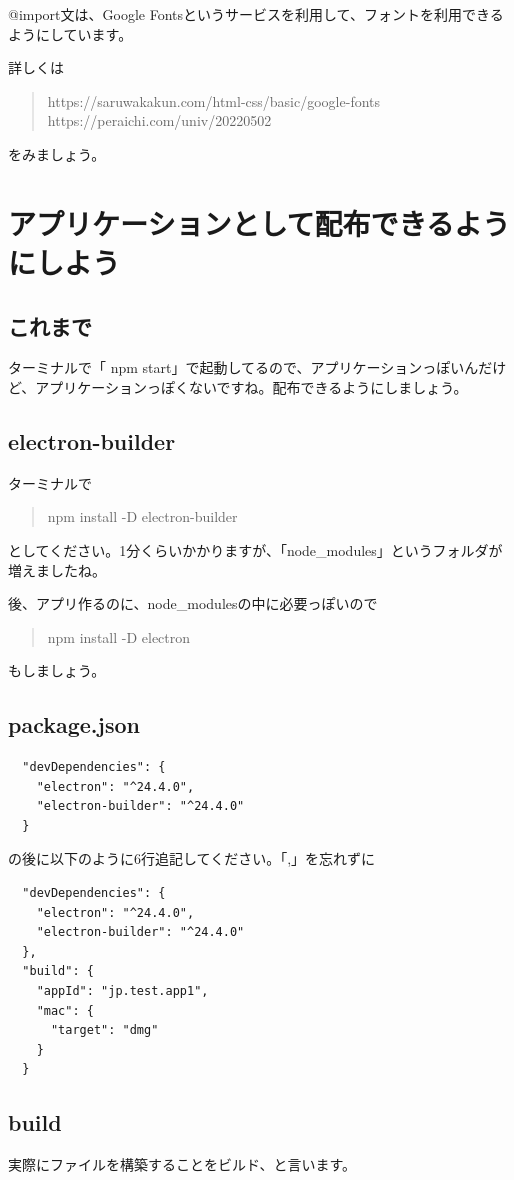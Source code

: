 \documentclass[mingoth,11pt,a4j,uplatex]{jsarticle}
\begin{document}
@import文は、Google Fontsというサービスを利用して、フォントを利用できるようにしています。

詳しくは
\begin{quote}
https://saruwakakun.com/html-css/basic/google-fonts
https://peraichi.com/univ/20220502
\end{quote}
をみましょう。

\section{アプリケーションとして配布できるようにしよう}
\subsection{これまで}
ターミナルで「 npm start」で起動してるので、アプリケーションっぽいんだけど、アプリケーションっぽくないですね。配布できるようにしましょう。

\subsection{electron-builder}
ターミナルで
\begin{quote}
npm install -D electron-builder
\end{quote}
としてください。1分くらいかかりますが、「node\_modules」というフォルダが増えましたね。

後、アプリ作るのに、node\_modulesの中に必要っぽいので
\begin{quote}
npm install -D electron
\end{quote}
もしましょう。

\subsection{package.json}
\begin{verbatim}
  "devDependencies": {
    "electron": "^24.4.0",
    "electron-builder": "^24.4.0"
  }
\end{verbatim}
の後に以下のように6行追記してください。「,」を忘れずに
\begin{verbatim}
  "devDependencies": {
    "electron": "^24.4.0",
    "electron-builder": "^24.4.0"
  },
  "build": {
    "appId": "jp.test.app1",
    "mac": {
      "target": "dmg"
    }
  }
\end{verbatim}

\subsection{build}
実際にファイルを構築することをビルド、と言います。
\end{document}

